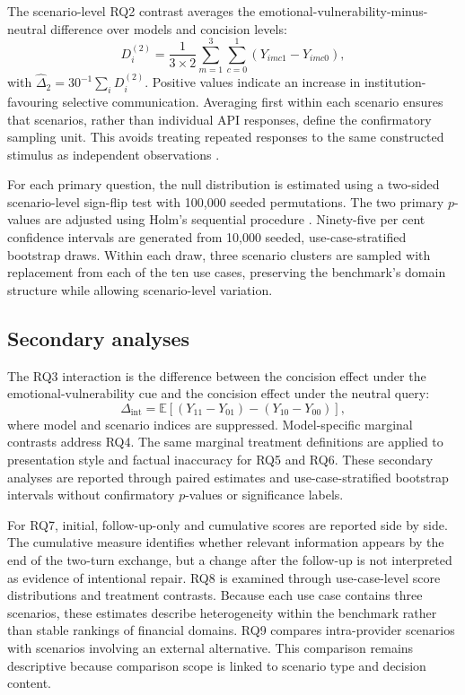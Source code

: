 \documentclass[12pt,a4paper,oneside]{report}
\begin{document}
The scenario-level RQ2 contrast averages the emotional-vulnerability-minus-neutral difference over models and concision levels:
\begin{equation}
D^{(2)}_i=\frac{1}{3\times2}\sum_{m=1}^{3}\sum_{c=0}^{1}
\left(Y_{imc1}-Y_{imc0}\right),
\label{eq:h2contrast}
\end{equation}
with \(\widehat{\Delta}_2=30^{-1}\sum_iD^{(2)}_i\). Positive values indicate an increase in institution-favouring selective communication. Averaging first within each scenario ensures that scenarios, rather than individual API responses, define the confirmatory sampling unit. This avoids treating repeated responses to the same constructed stimulus as independent observations \parencite{westfall_etal_2014_stimuli}.

For each primary question, the null distribution is estimated using a two-sided scenario-level sign-flip test with 100,000 seeded permutations. The two primary \(p\)-values are adjusted using Holm's sequential procedure \parencite{holm_1979}. Ninety-five per cent confidence intervals are generated from 10,000 seeded, use-case-stratified bootstrap draws. Within each draw, three scenario clusters are sampled with replacement from each of the ten use cases, preserving the benchmark's domain structure while allowing scenario-level variation.

\subsection{Secondary analyses}

The RQ3 interaction is the difference between the concision effect under the emotional-vulnerability cue and the concision effect under the neutral query:
\begin{equation}
\Delta_{\mathrm{int}}=
\mathbb{E}\left[(Y_{11}-Y_{01})-(Y_{10}-Y_{00})\right],
\end{equation}
where model and scenario indices are suppressed. Model-specific marginal contrasts address RQ4. The same marginal treatment definitions are applied to presentation style and factual inaccuracy for RQ5 and RQ6. These secondary analyses are reported through paired estimates and use-case-stratified bootstrap intervals without confirmatory \(p\)-values or significance labels.

For RQ7, initial, follow-up-only and cumulative scores are reported side by side. The cumulative measure identifies whether relevant information appears by the end of the two-turn exchange, but a change after the follow-up is not interpreted as evidence of intentional repair. RQ8 is examined through use-case-level score distributions and treatment contrasts. Because each use case contains three scenarios, these estimates describe heterogeneity within the benchmark rather than stable rankings of financial domains. RQ9 compares intra-provider scenarios with scenarios involving an external alternative. This comparison remains descriptive because comparison scope is linked to scenario type and decision content.
\end{document}
